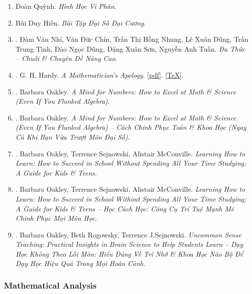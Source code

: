 \documentclass{article}
\begin{document}
\begin{enumerate}
	\item Đoàn Quỳnh. {\it Hình Học Vi Phân}.
	\item Bùi Duy Hiền. {\it Bài Tập Đại Số Đại Cương}.
	\item \cite{Nhi_Chin_Dung_Dung_Tinh_Dung_Son_Tuan2017}. Đàm Văn Nhỉ, Văn Đức Chín, Trần Thị Hồng Nhung, Lê Xuân Dũng, Trần Trung Tình, Đào Ngọc Dũng, Đặng Xuân Sơn, Nguyễn Anh Tuấn. {\it Đa Thức -- Chuỗi \& Chuyên Đề Nâng Cao}.
	\item \cite{Hardy1940, Hardy1992, Hardy2022}. G. H. Hardy. {\it A Mathematician's Apology}. [\href{https://github.com/NQBH/hobby/blob/master/advanced_mathematics/Hardy2017/NQBH_Hardy2017.pdf}{pdf}]. [\href{https://github.com/NQBH/hobby/blob/master/advanced_mathematics/Hardy2017/NQBH_Hardy2017.tex}{\TeX}].\hfill{\sf[done]}
	\item \cite{Oakley2014}. Barbara Oakley. {\it A Mind for Numbers: How to Excel at Math \& Science (Even If You Flunked Algebra)}.\hfill{\sf[reading]}
	\item \cite{Oakley_mind_number}. Barbara Oakley. {\it A Mind for Numbers: How to Excel at Math \& Science (Even If You Flunked Algebra) -- Cách Chinh Phục Toán \& Khoa Học (Ngay Cả Khi Bạn Vừa Trượt Môn Đại Số)}.\hfill{\sf[done]}
	\item \cite{Oakley_Sejnowski_McConville2018}. Barbara Oakley, Terrence Sejnowski, Alistair McConville. {\it Learning How to Learn: How to Succeed in School Without Spending All Your Time Studying; A Guide for Kids \& Teens}.\hfill{\sf[reading]}
	\item \cite{Oakley_Sejnowski_McConville_learn_how_learn}. Barbara Oakley, Terrence Sejnowski, Alistair McConville. {\it Learning How to Learn: How to Succeed in School Without Spending All Your Time Studying; A Guide for Kids \& Teens -- Học Cách Học: Công Cụ Trí Tuệ Mạnh Mẽ Chinh Phục Mọi Môn Học}.\hfill{\sf[done]}
	\item \cite{Oakley_Rogowsky_Sejnowski_McConville_uncommon_sense_teaching}. Barbara Oakley, Beth Rogowsky, Terrence J.Sejnowski. {\it Uncommon Sense Teaching: Practical Insights in Brain Science to Help Students Learn -- Dạy Học Không Theo Lối Mòn: Hiểu Đúng Về Trí Nhớ \& Khoa Học Não Bộ Để Dạy Học Hiệu Quả Trong Mọi Hoàn Cảnh}.\hfill{\sf[reading]}
\end{enumerate}

\subsubsection{Mathematical Analysis}
\end{document}
